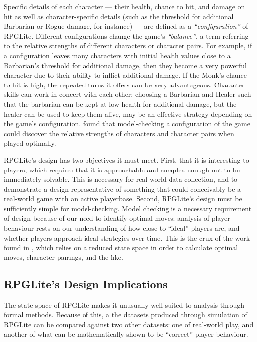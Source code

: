 Specific details of each character --- their health, chance to hit, and damage
on hit as well as character-specific details (such as the threshold for
additional Barbarian or Rogue damage, for instance) --- are defined as a
\emph{``configuration''} of RPGLite. Different configurations change the game's
\emph{``balance''}, a term referring to the relative strengths of different
characters or character pairs. For example, if a configuration leaves many
characters with initial health values close to a Barbarian's threshold for
additional damage, then they become a very powerful character due to their
ability to inflict additional damage. If the Monk's chance to hit is high, the
repeated turns it offers can be very advantageous. Character skills can work in
concert with each other: choosing a Barbarian and Healer such that the barbarian
can be kept at low health for additional damage, but the healer can be used to
keep them alive, may be an effective strategy depending on the game's
configuration. \citeauthor{kavanagh2020} found that model-checking a
configuration of the game could discover the relative strengths of characters
and character pairs when played optimally.

RPGLite's design has two objectives it must meet. First, that it is interesting
to players, which requires that it is approachable and complex enough not to be
immediately solvable. This is necessary for real-world data collection, and to
demonstrate a design representative of something that could conceivably be a
real-world game with an active playerbase. Second, RPGLite's design must be
sufficiently simple for model-checking. Model checking is a necessary
requirement of design because of our need to identify optimal moves: analysis of
player behaviour rests on our understanding of how close to ``ideal'' players
are, and whether players approach ideal strategies over time. This is the crux
of the work found in \cite{}, which relies on a reduced state space in order to calculate
optimal moves, character pairings, and the like.

\subsection{RPGLite's Design Implications}

The state space of RPGLite makes it unusually well-suited to analysis through formal methods.
Because of this, a the datasets produced through simulation of RPGLite can be compared against two other datasets: one of real-world play, and another of what can be mathematically shown to be ``correct'' player behaviour.

